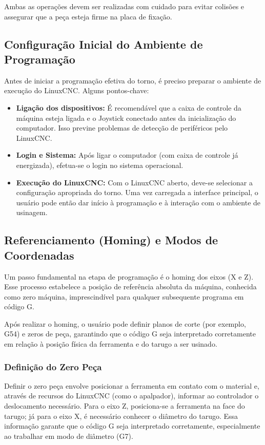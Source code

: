 Ambas as operações devem ser realizadas com cuidado para evitar colisões e assegurar que a peça esteja firme na placa de fixação.

\subsection{Configuração Inicial do Ambiente de Programação}

Antes de iniciar a programação efetiva do torno, é preciso preparar o ambiente de execução do LinuxCNC. Alguns pontos-chave:

\begin{itemize}
    \item \textbf{Ligação dos dispositivos:} É recomendável que a caixa de controle da máquina esteja ligada e o Joystick conectado antes da inicialização do computador. Isso previne problemas de detecção de periféricos pelo LinuxCNC.
    \item \textbf{Login e Sistema:} Após ligar o computador (com caixa de controle já energizada), efetua-se o login no sistema operacional. 
    \item \textbf{Execução do LinuxCNC:} Com o LinuxCNC aberto, deve-se selecionar a configuração apropriada do torno. Uma vez carregada a interface principal, o usuário pode então dar início à programação e à interação com o ambiente de usinagem.
\end{itemize}

\subsection{Referenciamento (Homing) e Modos de Coordenadas}

Um passo fundamental na etapa de programação é o homing dos eixos (X e Z). Esse processo estabelece a posição de referência absoluta da máquina, conhecida como zero máquina, imprescindível para qualquer subsequente programa em código G. 

Após realizar o homing, o usuário pode definir planos de corte (por exemplo, G54) e zeros de peça, garantindo que o código G seja interpretado corretamente em relação à posição física da ferramenta e do tarugo a ser usinado.

\subsubsection{Definição do Zero Peça}

Definir o zero peça envolve posicionar a ferramenta em contato com o material e, através de recursos do LinuxCNC (como o apalpador), informar ao controlador o deslocamento necessário. Para o eixo Z, posiciona-se a ferramenta na face do tarugo; já para o eixo X, é necessário conhecer o diâmetro do tarugo. Essa informação garante que o código G seja interpretado corretamente, especialmente ao trabalhar em modo de diâmetro (G7).

